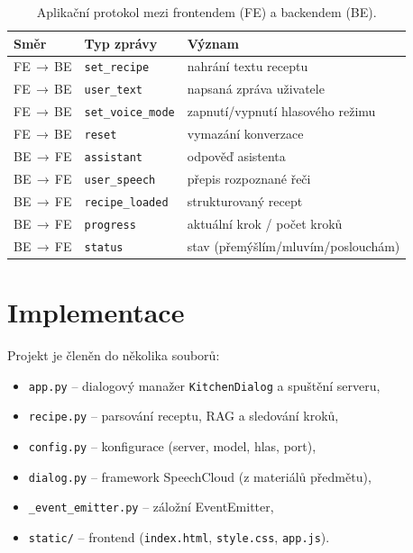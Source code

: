 \documentclass[11pt,a4paper]{article}
\begin{document}
\begin{table}[h]
\centering
\small
\begin{tabular}{@{}lll@{}}
\toprule
\textbf{Směr} & \textbf{Typ zprávy} & \textbf{Význam} \\
\midrule
FE\,$\to$\,BE & \texttt{set\_recipe}      & nahrání textu receptu \\
FE\,$\to$\,BE & \texttt{user\_text}       & napsaná zpráva uživatele \\
FE\,$\to$\,BE & \texttt{set\_voice\_mode} & zapnutí/vypnutí hlasového režimu \\
FE\,$\to$\,BE & \texttt{reset}            & vymazání konverzace \\
BE\,$\to$\,FE & \texttt{assistant}        & odpověď asistenta \\
BE\,$\to$\,FE & \texttt{user\_speech}     & přepis rozpoznané řeči \\
BE\,$\to$\,FE & \texttt{recipe\_loaded}   & strukturovaný recept \\
BE\,$\to$\,FE & \texttt{progress}         & aktuální krok / počet kroků \\
BE\,$\to$\,FE & \texttt{status}           & stav (přemýšlím/mluvím/poslouchám) \\
\bottomrule
\end{tabular}
\caption{Aplikační protokol mezi frontendem (FE) a backendem (BE).}
\label{tab:proto}
\end{table}

\section{Implementace}
Projekt je členěn do několika souborů:
\begin{itemize}[noitemsep]
  \item \texttt{app.py} -- dialogový manažer \texttt{KitchenDialog} a spuštění serveru,
  \item \texttt{recipe.py} -- parsování receptu, RAG a sledování kroků,
  \item \texttt{config.py} -- konfigurace (server, model, hlas, port),
  \item \texttt{dialog.py} -- framework SpeechCloud (z materiálů předmětu),
  \item \texttt{\_event\_emitter.py} -- záložní EventEmitter,
  \item \texttt{static/} -- frontend (\texttt{index.html}, \texttt{style.css}, \texttt{app.js}).
\end{itemize}
\end{document}
